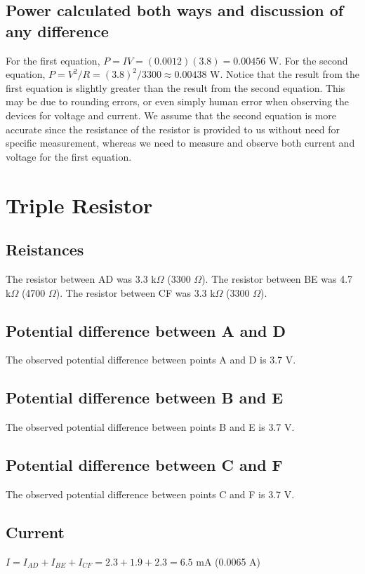 \documentclass[12pt]{article}
\begin{document}
\subsection{Power calculated both ways and discussion of any difference}
For the first equation, $P = IV = (0.0012)(3.8) = 0.00456 $ W. For the second equation,
$P = V^2/R = (3.8)^2/3300 \approx 0.00438$ W. Notice that the result from the first equation is slightly
greater than the result from the second equation. This may be due to rounding errors, or even simply human error when observing
the devices for voltage and current. We assume that the second equation is more accurate since the resistance of the resistor
is provided to us without need for specific measurement, whereas we need to measure and observe both current and voltage for the first equation.

\section{Triple Resistor}
\subsection{Reistances}
The resistor between AD was 3.3 k$\Omega$ (3300 $\Omega$).
The resistor between BE was 4.7 k$\Omega$ (4700 $\Omega$).
The resistor between CF was 3.3 k$\Omega$ (3300 $\Omega$).

\subsection{Potential difference between A and D}
The observed potential difference between points A and D is 3.7 V.

\subsection{Potential difference between B and E}
The observed potential difference between points B and E is 3.7 V.

\subsection{Potential difference between C and F}
The observed potential difference between points C and F is 3.7 V.

\subsection{Current}
$I = I_{AD} + I_{BE} + I_{CF} = 2.3 + 1.9 + 2.3 = 6.5$ mA (0.0065 A)
\end{document}
